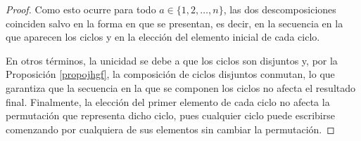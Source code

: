 \begin{proof}
	Como esto ocurre para todo \(a \in \{1,2,\dots,n\}\), las dos descomposiciones coinciden salvo en la forma en que se presentan, es decir, en la secuencia en la que aparecen los ciclos y en la elección del elemento inicial de cada ciclo.
	
	\medskip
	\noindent 
	En otros términos, la unicidad se debe a que los ciclos son disjuntos y, por la Proposición \ref{propojhgf}, la composición de ciclos disjuntos conmutan, lo que garantiza que la secuencia en la que se componen los ciclos no afecta el resultado final. Finalmente, la elección del primer elemento de cada ciclo no afecta la permutación que representa dicho ciclo, pues cualquier ciclo puede escribirse comenzando por cualquiera de sus elementos sin cambiar la permutación.
	
\end{proof}




\begin{definicion}
\end{definicion}


\begin{ejemplo}
\end{ejemplo}




